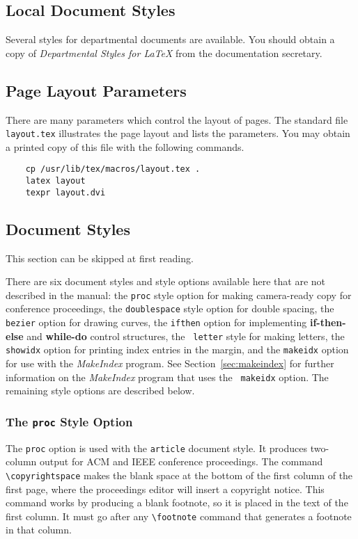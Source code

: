 \subsection{Local Document Styles}

Several styles for departmental documents are available.
You should obtain a copy of {\em Departmental Styles for \LaTeX\/}
\cite{Crowl88} from the documentation secretary.

\subsection{Page Layout Parameters}

There are many parameters which control the layout of pages. 
The standard file {\tt layout.tex} illustrates the page layout
and lists the parameters.
You may obtain a printed copy of this file with the
following commands.
\begin{verbatim}
    cp /usr/lib/tex/macros/layout.tex .
    latex layout
    texpr layout.dvi
\end{verbatim}

\subsection{Document Styles}

This section can be skipped at first reading.

There are six document styles and style options available here that
are not described in the manual: the \mbox{\tt proc} style option for
making camera-ready copy for conference proceedings,
the {\tt doublespace} style option for double spacing,
the {\tt bezier}
option for drawing curves, the {\tt ifthen} option for implementing
{\bf if-then-else} and {\bf while-do} control structures, the \mbox{\tt
letter} style for making letters, the {\tt showidx} option for
printing index entries in the margin, and the {\tt makeidx} option for use
with the {\it MakeIndex\/} program.
See Section~\ref{sec:makeindex} for further
information on the {\em MakeIndex\/} program that uses the {\tt
makeidx} option.
The remaining style options are described
below.

\subsubsection{The {\tt proc} Style Option}

The {\tt proc} option is used with the \mbox{\tt article} document
style.  It produces two-column output for ACM and IEEE conference
proceedings.  The command \hbox{\verb|\copyrightspace|} makes the blank
space at the bottom of the first column of the first page, where the
proceedings editor will insert a copyright notice.  This command works
by producing a blank footnote, so it is placed in the text of the first
column.  It must go after any \hbox{\verb|\footnote|} command that
generates a footnote in that column.

